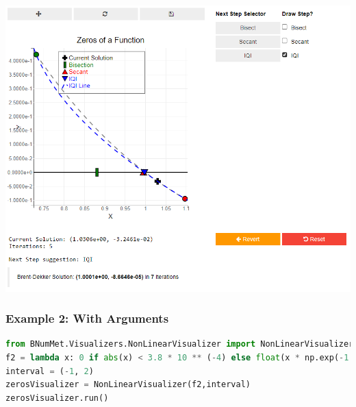 \begin{enumerate}
    \includegraphics[scale=0.6]{Include/Images/Thesis/Documentation/Visualizers/NonLinear/Example 1/Example 1 - 04 - IQI checkbox only.png}
\end{enumerate}



\subsubsection{Example 2: With Arguments}
\begin{lstlisting}[language=Python]
from BNumMet.Visualizers.NonLinearVisualizer import NonLinearVisualizer
f2 = lambda x: 0 if abs(x) < 3.8 * 10 ** (-4) else float(x * np.exp(-1 / x**2))
interval = (-1, 2)
zerosVisualizer = NonLinearVisualizer(f2,interval)
zerosVisualizer.run()
\end{lstlisting}

